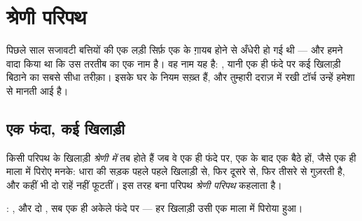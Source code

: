 \chapter{श्रेणी परिपथ}\label{ch:g4:series-circuits}

पिछले साल सजावटी बत्तियों की एक लड़ी सिर्फ़ एक  के ग़ायब होने से
अँधेरी हो गई थी --- और हमने वादा किया था कि उस तरतीब का एक नाम है।
वह नाम यह है: , यानी एक ही फंदे पर कई खिलाड़ी बिठाने का
सबसे सीधा तरीक़ा। इसके घर के नियम सख़्त हैं, और तुम्हारी दराज़ में रखी
टॉर्च उन्हें हमेशा से मानती आई है।

\section{एक फंदा, कई खिलाड़ी}

\begin{definition}[श्रेणी में]\label{def:g4:series-circuits:series}
किसी परिपथ के खिलाड़ी \emph{श्रेणी में} तब होते
हैं जब वे एक ही फंदे पर, एक के बाद एक बैठे हों, जैसे एक ही माला में
पिरोए मनके: धारा की सड़क पहले पहले खिलाड़ी से, फिर दूसरे से, फिर तीसरे
से गुज़रती है, और कहीं भी दो राहें नहीं फूटतीं। इस तरह बना परिपथ
\emph{श्रेणी परिपथ} कहलाता है।
\end{definition}

\begin{omfigure}

{\small {}: ,  और दो , सब एक ही अकेले फंदे पर
--- हर खिलाड़ी उसी एक माला में पिरोया हुआ।}
\end{omfigure}

